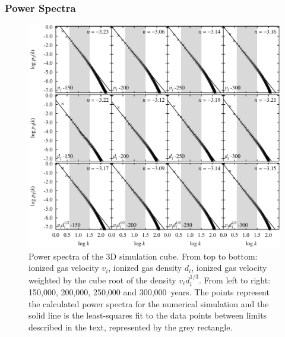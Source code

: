 \documentclass[useAMS,usenatbib]{mn2e}
\begin{document}
\subsubsection{Power Spectra}
\label{sssec:pspec}
\begin{figure}
\centering
\includegraphics[width=\textwidth]{ps-all-3k-ref}
\caption{Power spectra of the 3D simulation cube. From top to bottom: ionized gas velocity
  $v_i$, ionized gas density $d_i$, ionized gas velocity weighted by the cube root
  of the density $v_i d_i^{1/3}$.  From left to right: 150,000, 200,000, 250,000 and
  300,000~years. The points represent the calculated power spectra for
  the numerical simulation  and the solid line is the least-squares fit to
the data points between limits described in the
text, represented by the grey rectangle.}
\label{fig:ps}
\end{figure}
\end{document}
